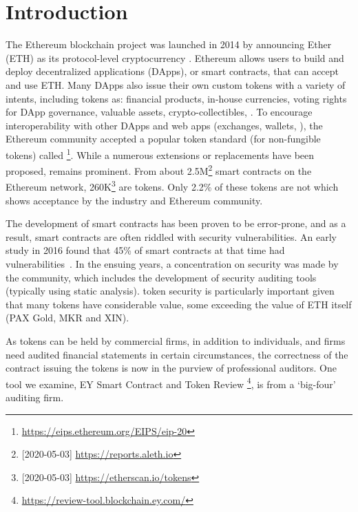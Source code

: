 
\section{Introduction}
\label{sect:introduction}

The Ethereum blockchain project was launched in 2014 by announcing Ether (ETH) as its protocol-level cryptocurrency \cite{EthGit,EIP150}. Ethereum allows users to build and deploy decentralized applications (DApps), or smart contracts, that can accept and use ETH. Many DApps also issue their own custom tokens with a variety of intents, including tokens as: financial products, in-house currencies, voting rights for DApp governance, valuable assets, crypto-collectibles, \etc. To encourage interoperability with other DApps and web apps (exchanges, wallets, \etc), the Ethereum community accepted a popular token standard (for non-fungible tokens) called \erc\footnote{\url{https://eips.ethereum.org/EIPS/eip-20}}. While a numerous \erc extensions or replacements have been proposed, \erc remains prominent. From about 2.5M\footnote{[2020-05-03] \url{https://reports.aleth.io}} smart contracts on the Ethereum network, 260K\footnote{[2020-05-03] \url{https://etherscan.io/tokens}} are tokens. Only 2.2\% of these tokens are not \erc\cite{EtherScan} which shows \erc acceptance by the industry and Ethereum community.

The development of smart contracts has been proven to be error-prone, and as a result, smart contracts are often riddled with security vulnerabilities. An early study in 2016 found that 45\% of smart contracts at that time had vulnerabilities~\cite{MakSm}. In the ensuing years, a concentration on security was made by the community, which includes the development of security auditing tools (typically using static analysis). \erc token security is particularly important given that many tokens have considerable value, some exceeding the value of ETH itself (\eg PAX Gold, MKR and XIN). 

As tokens can be held by commercial firms, in addition to individuals, and firms need audited financial statements in certain circumstances, the correctness of the contract issuing the tokens is now in the purview of professional auditors. One tool we examine, EY Smart Contract and Token Review \footnote{\url{https://review-tool.blockchain.ey.com/}}, is from a `big-four' auditing firm. 

